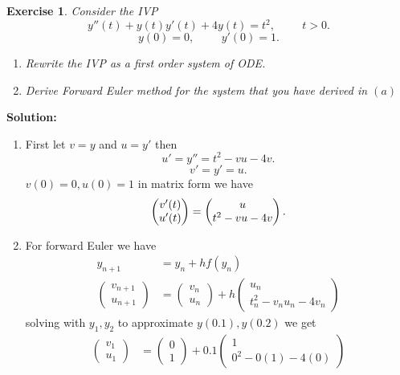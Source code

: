 \documentclass[a4paper,12pt]{scrartcl} %
\newenvironment{solution}
  {\par\color{answercolor}\textbf{Solution:}\ }
  {\par}
\newcounter{customcounter}
\theoremstyle{darktheorem}
\newtheorem{exercise}[customcounter]{Exercise}
\begin{document}
\begin{exercise}
    Consider the IVP
    \[
        y''(t) + y(t)y'(t) + 4y(t) = t^2, \hspace{1cm} t > 0
    .\] 
    \[
        y(0) = 0, \hspace{1cm} y'(0) = 1
    .\] 
    \begin{enumerate}
        \item Rewrite the IVP as a first order system of ODE.
        \item Derive Forward Euler method for the system that you have derived in $(a)$
    \end{enumerate}
\end{exercise}
\begin{solution}
    \begin{enumerate}
        \item First let $v =y$ and $u = y'$ then
            \[
            u' = y'' = t^2 - vu -4v
            .\] 
            \[
            v' = y' = u 
            .\] 
            $v(0) = 0, u(0) = 1$
            in matrix form we have
             \[
            \begin{pmatrix} v'(t) \\ u'(t) \end{pmatrix} = \begin{pmatrix} u \\ t^2 - vu - 4v  \end{pmatrix} \\
            .\] 
        \item For forward Euler we have
            \begin{align*}
                y_{n+1} &= y_{n} + hf(y_{n})\\
                \begin{pmatrix} v_{n+1} \\ u_{n+1} \end{pmatrix} &= \begin{pmatrix} v_n \\ u_n \end{pmatrix} + h \begin{pmatrix} u_n \\ t_n^2 - v_nu_n -4v_n \end{pmatrix} 
            \end{align*}
            solving with $y_1,y_2$ to approximate $y(0.1), y(0.2)$ we get
            \begin{align*}
                \begin{pmatrix} v_1 \\ u_1 \end{pmatrix} &= \begin{pmatrix} 0 \\ 1 \end{pmatrix} + 0.1 \begin{pmatrix} 1 \\ 0^2 - 0(1) - 4(0) \end{pmatrix} \\

\end{align*}
\end{enumerate}
\end{solution}
\end{document}
